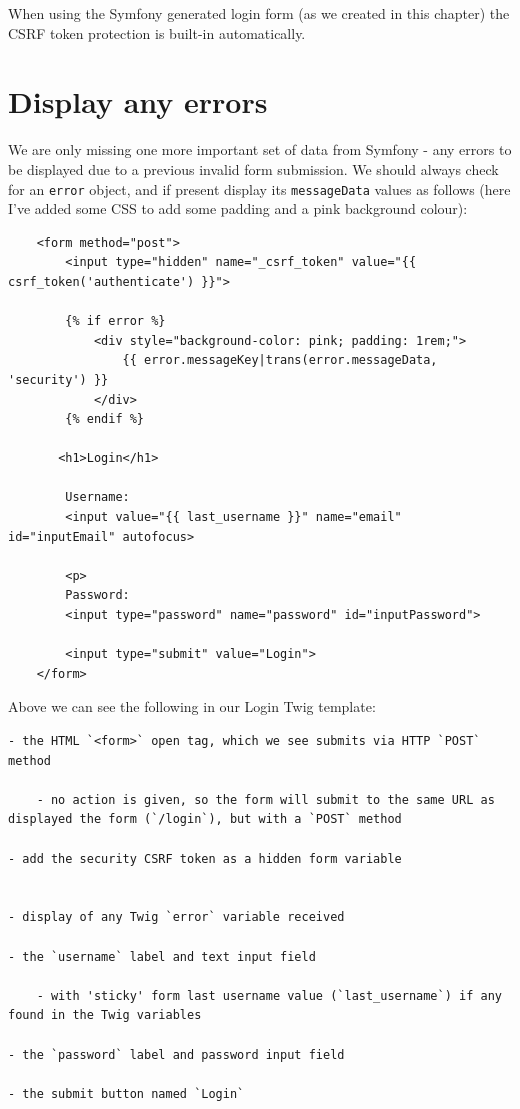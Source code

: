 \documentclass[a4paperpaper,openright]{book}
\begin{document}
When using the Symfony generated login form (as we created in this
chapter) the CSRF token protection is built-in automatically.

\hypertarget{display-any-errors}{%
\section{Display any errors}\label{display-any-errors}}

We are only missing one more important set of data from Symfony - any
errors to be displayed due to a previous invalid form submission. We
should always check for an \texttt{error} object, and if present display
its \texttt{messageData} values as follows (here I've added some CSS to
add some padding and a pink background colour):

\begin{verbatim}
    <form method="post">
        <input type="hidden" name="_csrf_token" value="{{ csrf_token('authenticate') }}">

        {% if error %}
            <div style="background-color: pink; padding: 1rem;">
                {{ error.messageKey|trans(error.messageData, 'security') }}
            </div>
        {% endif %}

       <h1>Login</h1>

        Username:
        <input value="{{ last_username }}" name="email" id="inputEmail" autofocus>

        <p>
        Password:
        <input type="password" name="password" id="inputPassword">

        <input type="submit" value="Login">
    </form>
\end{verbatim}

Above we can see the following in our Login Twig template:

\begin{verbatim}
- the HTML `<form>` open tag, which we see submits via HTTP `POST` method

    - no action is given, so the form will submit to the same URL as displayed the form (`/login`), but with a `POST` method

- add the security CSRF token as a hidden form variable    


- display of any Twig `error` variable received

- the `username` label and text input field

    - with 'sticky' form last username value (`last_username`) if any found in the Twig variables

- the `password` label and password input field

- the submit button named `Login`
\end{verbatim}
\end{document}

